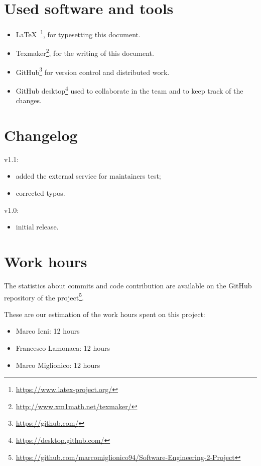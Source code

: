 \section{Used software and tools}
\begin{itemize}
    \item \LaTeX\ \footnote{\url{https://www.latex-project.org/}}, for typesetting this document.
    \item Texmaker\footnote{\url{http://www.xm1math.net/texmaker/}}, for the writing of this document.
    \item GitHub\footnote{\url{https://github.com/}} for version control and distributed work.
   \item GitHub desktop\footnote{\url{https://desktop.github.com/}} used to collaborate in the team and to keep track of the changes. 
\end{itemize}

\section{Changelog}

v1.1:
\begin{itemize}
\item added the external service for maintainers test;
\item corrected typos.
\end{itemize}

v1.0:
\begin{itemize}
\item initial release.
\end{itemize}



\section{Work hours}
The statistics about commits and code contribution are available on the GitHub repository of the project\footnote{\url{https://github.com/marcomiglionico94/Software-Engineering-2-Project}}.

These are our estimation of the work hours spent on this project:
\begin{itemize}
    \item Marco Ieni: 12 hours
    \item Francesco Lamonaca: 12 hours
    \item Marco Miglionico: 12 hours
\end{itemize}
